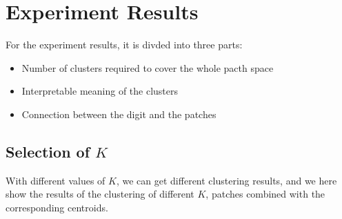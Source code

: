 \documentclass{article}
\begin{document}
\clearpage

\section{Experiment Results}\label{sec:experiment}


\quad

For the experiment results, it is divded into three parts:

\begin{itemize}
    \item Number of clusters required to cover the whole pacth space
    \item Interpretable meaning of the clusters
    \item Connection between the digit and the patches
\end{itemize}

\subsection{Selection of $K$}

With different values of $K$, we can get different clustering results, and we here show the results of the clustering of different $K$, patches combined with the corresponding centroids.
\end{document}
